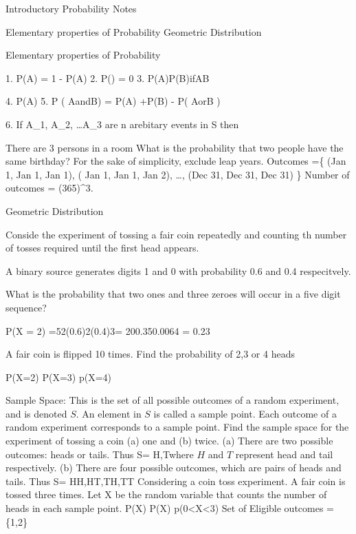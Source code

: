 Introductory Probability Notes
 

Elementary properties of Probability
Geometric Distribution
 
Elementary properties of Probability
 
  1. P(A) = 1 - P(A)
2. P() = 0
3. P(A)P(B)ifAB
 
4. P(A) 
5.
P ( AandB) = P(A) +P(B) - P( AorB )
 
6. If A_1, A_2, \ldots A_3  are n arebitary events in S then
 
 
There are 3 persons in a room
What is the probability that two people have the same birthday?
For the sake of simplicity, exclude leap years.
Outcomes =\{ (Jan 1, Jan 1, Jan 1), ( Jan 1, Jan 1, Jan 2), \ldots , (Dec 31, Dec 31, Dec 31) \}
Number of outcomes = (365)^3.
 
Geometric Distribution
 
Conside the experiment of tossing a fair coin repeatedly and counting th number of tosses required until the first head appears.
 
 
A binary source generates digits 1 and 0 with probability  0.6 and 0.4 respecitvely.
 
What is the probability that two ones and three zeroes will occur in a five digit sequence?
 
 
P(X = 2) =52(0.6)2(0.4)3= 200.350.0064 = 0.23
 
A fair coin is flipped 10 times. Find the probability of 2,3 or 4 heads
 
P(X=2)
P(X=3)
p(X=4)
 

 

Sample Space: This is the set of all possible outcomes of a random experiment, and is denoted $S$. An element in $S$ is called a sample point.
Each outcome of a random experiment corresponds to a sample point.
Find the sample space for the experiment of tossing a coin (a) one and (b) twice.
(a) There are two possible outcomes: heads or tails.
Thus
S= {H,T}where $H$ and $T$ represent head and tail respectively.
(b) There are four possible outcomes, which are pairs of heads and tails.
Thus S= {HH,HT,TH,TT} 
Considering a coin toss experiment. A fair coin is tossed three times.
Let X be the random variable that counts the number of heads in each sample point.
P(X)
P(X)
p(0<X<3)
Set of Eligible outcomes = \{1,2\}


